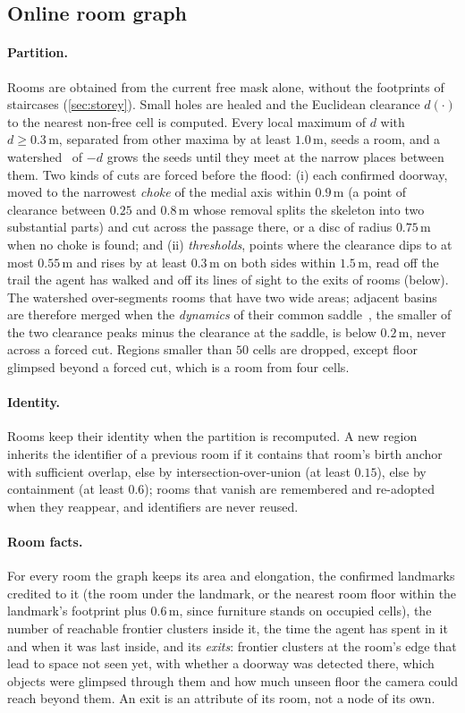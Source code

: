 \documentclass[10pt]{article}
\newcommand{\m}{\,\mathrm{m}}
\begin{document}
\subsection{Online room graph}\label{sec:rooms}
\paragraph{Partition.} Rooms are obtained from the current free mask alone,
without the footprints of staircases (\cref{sec:storey}).
Small holes are healed and the Euclidean clearance $d(\cdot)$ to the nearest
non-free cell is computed. Every local maximum of $d$ with $d\ge0.3\m$,
separated from other maxima by at least $1.0\m$, seeds a room, and a
watershed~\citep{vincent1991watersheds} of $-d$ grows the seeds until they
meet at the narrow places between them. Two kinds of cuts are forced before
the flood: (i) each confirmed doorway, moved to the narrowest \emph{choke} of
the medial axis within $0.9\m$ (a point of clearance between $0.25$ and
$0.8\m$ whose removal splits the skeleton into two substantial parts) and cut
across the passage there, or a disc of radius $0.75\m$ when no choke is found;
and (ii) \emph{thresholds}, points where the clearance dips to at most
$0.55\m$ and rises by at least $0.3\m$ on both sides within $1.5\m$, read off
the trail the agent has walked and off its lines of sight to the exits of
rooms (below). The watershed over-segments rooms that
have two wide areas; adjacent basins are therefore merged when the
\emph{dynamics} of their common saddle~\citep{grimaud1992new}, the smaller of
the two clearance peaks minus the clearance at the saddle, is below $0.2\m$,
never across a forced cut. Regions smaller than $50$ cells are dropped, except
floor glimpsed beyond a forced cut, which is a room from four cells.

\paragraph{Identity.} Rooms keep their identity when the partition is
recomputed. A new region inherits the identifier
of a previous room if it contains that room's birth anchor with sufficient
overlap, else by intersection-over-union (at least $0.15$), else by
containment (at least $0.6$); rooms that vanish are remembered and re-adopted
when they reappear, and identifiers are never reused.

\paragraph{Room facts.} For every room the graph keeps its area and elongation,
the confirmed landmarks credited to it (the room under the landmark, or the
nearest room floor within the landmark's footprint plus $0.6\m$, since
furniture stands on occupied cells), the number of reachable frontier clusters
inside it, the time the agent has spent in it and when it was last inside, and
its \emph{exits}: frontier clusters at the room's edge that lead to space not
seen yet, with whether a doorway was detected there, which objects were
glimpsed through them and how much unseen floor the camera could reach beyond
them. An exit is an attribute of its room, not a node of its own.
\end{document}
